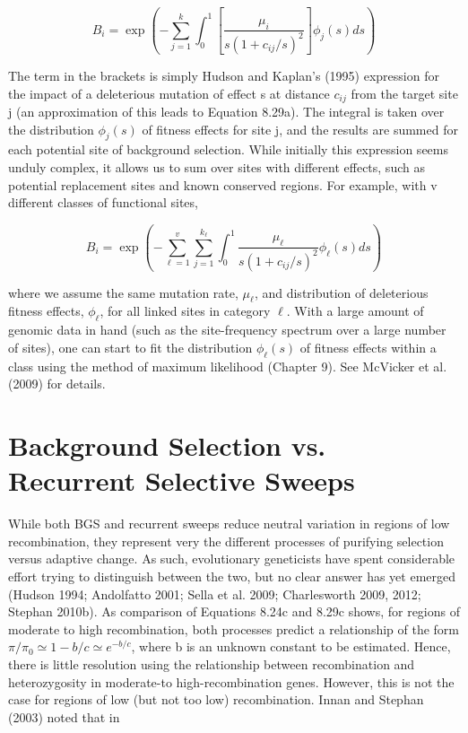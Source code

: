 \documentclass{article}
\begin{document}
\begin{equation}
B_{i}=\exp\left(-\sum_{j=1}^{k}\int_{0}^{1}\left[\frac{\mu_{i}}{s(1+c_{ij}/s)^{2}}\right]\phi_{j}(s)ds\right)
\tag{8.31a}
\label{eq:8_31a}
\end{equation}

The term in the brackets is simply Hudson and Kaplan's (1995) expression for the impact of a deleterious mutation of effect s at distance  $ c_{ij} $ from the target site j (an approximation of this leads to Equation 8.29a). The integral is taken over the distribution  $ \phi_j(s) $ of fitness effects for site j, and the results are summed for each potential site of background selection. While initially this expression seems unduly complex, it allows us to sum over sites with different effects, such as potential replacement sites and known conserved regions. For example, with v different classes of functional sites,

\begin{equation}
B_{i}=\exp\left(-\sum_{\ell=1}^{v}\sum_{j=1}^{k_{\ell}}\int_{0}^{1}\frac{\mu_{\ell}}{s(1+c_{i j}/s)^{2}}\phi_{\ell}(s)d s\right)
\tag{8.31b}
\label{eq:8_31b}
\end{equation}

where we assume the same mutation rate,  $ \mu_{\ell} $, and distribution of deleterious fitness effects,  $ \phi_{\ell} $, for all linked sites in category  $ \ell $. With a large amount of genomic data in hand (such as the site-frequency spectrum over a large number of sites), one can start to fit the distribution  $ \phi_{\ell}(s) $ of fitness effects within a class using the method of maximum likelihood (Chapter 9). See McVicker et al. (2009) for details.

\section{Background Selection vs. Recurrent Selective Sweeps}
While both BGS and recurrent sweeps reduce neutral variation in regions of low recombination, they represent very the different processes of purifying selection versus adaptive change. As such, evolutionary geneticists have spent considerable effort trying to distinguish between the two, but no clear answer has yet emerged (Hudson 1994; Andolfatto 2001; Sella et al. 2009; Charlesworth 2009, 2012; Stephan 2010b). As comparison of Equations 8.24c and 8.29c shows, for regions of moderate to high recombination, both processes predict a relationship of the form  $ \pi/\pi_0 \simeq 1 - b/c \simeq e^{-b/c} $, where b is an unknown constant to be estimated. Hence, there is little resolution using the relationship between recombination and heterozygosity in moderate-to high-recombination genes. However, this is not the case for regions of low (but not too low) recombination. Innan and Stephan (2003) noted that in
\end{document}
